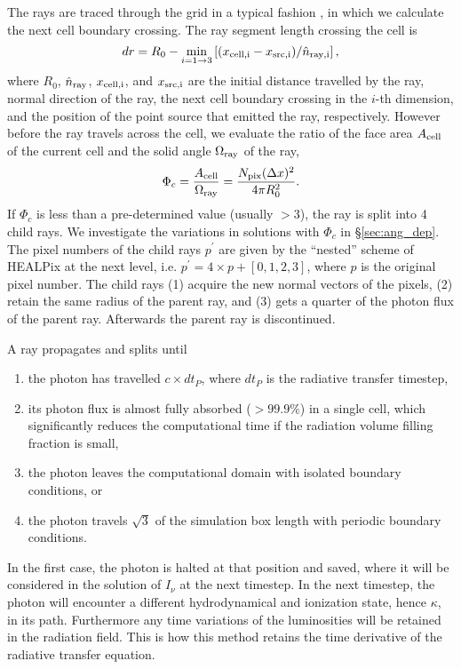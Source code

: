 \documentclass[useAMS,usenatbib,a4paper]{mn2e}
\begin{document}
The rays are traced through the grid in a typical fashion
\citep[e.g.][]{Abel99_RT}, in which we calculate the next cell
boundary crossing.  The ray segment length crossing the cell is
%
\begin{equation}
  \label{eqn:trace}
  dr = R_0 - \min_{i=1 \rightarrow 3} \left[(x_{\rm cell,i} - x_{\rm src,i}) /
    \hat{n}_{\rm ray,i} \right],
\end{equation}
%
where $R_0$, $\hat{n}_{\rm ray}$, $x_{\rm cell,i}$, and $x_{\rm
  src,i}$ are the initial distance travelled by the ray, normal
direction of the ray, the next cell boundary crossing in the $i$-th
dimension, and the position of the point source that emitted the ray,
respectively.  However before the ray travels across the cell, we
evaluate the ratio of the face area $A_{\rm cell}$ of the current cell
and the solid angle $\Omega_{\rm ray}$ of the ray,
%
\begin{equation}
  \label{eqn:split}
  \Phi_c = \frac{A_{\rm cell}} {\Omega_{\rm ray}} = 
  \frac{N_{\rm pix} (\Delta x)^2} {4\pi R_0^2}.
\end{equation}
%
If $\Phi_c$ is less than a pre-determined value (usually $>3$), the
ray is split into 4 child rays.  We investigate the variations in
solutions with $\Phi_c$ in \S\ref{sec:ang_dep}.  The pixel numbers
of the child rays $p^\prime$ are given by the ``nested'' scheme of
HEALPix at the next level, i.e. $p^\prime = 4 \times p + [0,1,2,3]$,
where $p$ is the original pixel number.  The child rays (1) acquire
the new normal vectors of the pixels, (2) retain the same radius of
the parent ray, and (3) gets a quarter of the photon flux of the
parent ray.  Afterwards the parent ray is discontinued.

A ray propagates and splits until 
%
\begin{enumerate}
\item the photon has travelled $c \times dt_P$, where $dt_P$ is the
  radiative transfer timestep,
\item its photon flux is almost fully absorbed ($>99.9\%$) in a single
  cell, which significantly reduces the computational time if the
  radiation volume filling fraction is small,
\item the photon leaves the computational domain with isolated
  boundary conditions, or
\item the photon travels $\sqrt{3}$ of the simulation box length with
  periodic boundary conditions.
\end{enumerate}
%
In the first case, the photon is halted at that position and saved,
where it will be considered in the solution of $I_\nu$ at the next
timestep.  In the next timestep, the photon will encounter a different
hydrodynamical and ionization state, hence $\kappa$, in its path.
Furthermore any time variations of the luminosities will be retained
in the radiation field.  This is how this method retains the time
derivative of the radiative transfer equation.
\end{document}

